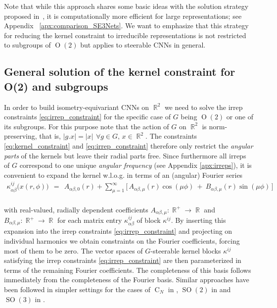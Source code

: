 \documentclass{article}
\newcommand{\apx}{Appendix\xspace
}
\DeclareMathOperator*{\R}{\mathbb{R}}
\renewcommand{\O}[1]{\ensuremath{\operatorname{O}(#1)}}
\newcommand{\SO}[1]{\ensuremath{\operatorname{SO}(#1)}}
\newcommand{\CN}{\ensuremath{\operatorname{C}_{\!N}}}
\newlength{\secBefore}
\newlength{\secAfter}
\newlength{\subsecBefore}
\newlength{\subsecAfter}
\begin{document}
Note that while this approach shares some basic ideas with the solution strategy proposed in~\cite{3d_steerableCNNs}, it is computationally more efficient for large representations; see \apx~\ref{apx:comparison_SE3Nets}.
We want to emphasize that this strategy for reducing the kernel constraint to irreducible representations is not restricted to subgroups of $\O2$ but applies to steerable CNNs in general.

 	

\vspace*{\subsecBefore}
\subsection{General solution of the kernel constraint for O(2) and subgroups}
\label{sec:kernel_constraint_solution_main}
\vspace*{\subsecAfter}


In order to build isometry-equivariant CNNs on $\R^2$
we need to solve the irrep constraints \eqref{eq:irrep_constraint} for the specific case of $G$ being $\O2$ or one of its subgroups.
For this purpose note that the action of $G$ on $\R^2$ is norm-preserving, that is, $|g.x|=|x|\,\ \forall g\in G,\,x\in\R^2$.
The constraints \eqref{eq:kernel_constraint} and \eqref{eq:irrep_constraint} therefore only restrict the \emph{angular parts} of the kernels but leave their radial parts free.
Since furthermore all irreps of $G$ correspond to one unique \emph{angular frequency}
(see \apx \ref{apx:irreps}),
it is convenient to expand the kernel w.l.o.g. in terms of an (angular) Fourier series\begin{align}\label{eq:fourier_decomposition_kernel}
    \kappa_{\alpha\beta}^{ij} \big(x(r,\phi)\big)\ \ =\ \ A_{\alpha\beta,0}(r) + \sum\nolimits_{\mu=1}^\infty \Big[\,A_{\alpha\beta,\mu}(r)\cos(\mu\phi)\ +\ B_{\alpha\beta,\mu}(r)\sin(\mu\phi) \,\Big]
\end{align}
~\\[-2.ex]
with real-valued, radially dependent coefficients $A_{\alpha\beta,\mu}:\R^+\to\R$ and $B_{\alpha\beta,\mu}:\R^+\to\R$ for each matrix entry $\kappa_{\alpha\beta}^{ij}$ of block $\kappa^{ij}$.
By inserting this expansion into the irrep constraints \eqref{eq:irrep_constraint} and projecting on individual harmonics we obtain constraints on the Fourier coefficients, forcing most of them to be zero.
The vector spaces of $G$-steerable kernel blocks $\kappa^{ij}$ satisfying the irrep constraints \eqref{eq:irrep_constraint} are then parameterized in terms of the remaining Fourier coefficients.
The completeness of this basis follows immediately from the completeness of the Fourier basis.
Similar approaches have been followed in simpler settings for the cases of $\CN$ in \cite{Weiler2018-STEERABLE}, $\SO2$ in \cite{Worrall2017-HNET} and $\SO3$ in \cite{3d_steerableCNNs}.
\end{document}
